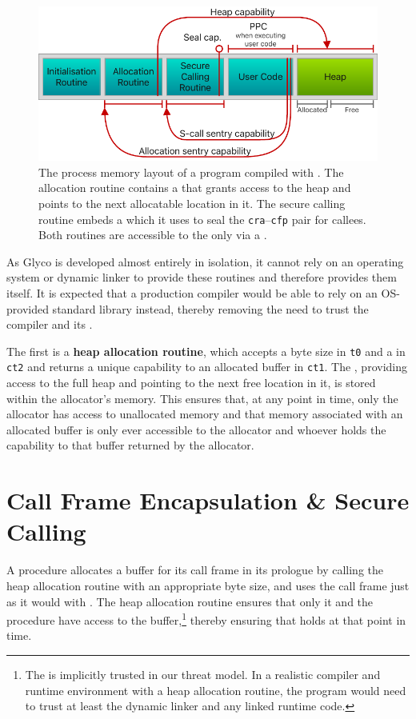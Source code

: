 \documentclass[main.tex]{subfiles}
\begin{document}
\begin{figure}
	\begin{center}
		\includegraphics{Images/GHSCC Process Memory.pdf}
	\end{center}
	\caption{The process memory layout of a program compiled with . The allocation routine contains a  that grants access to the heap and points to the next allocatable location in it. The secure calling routine embeds a  which it uses to seal the \texttt{cra}–\texttt{cfp} pair for callees. Both routines are accessible to the  only via a .}
	\label{fig:procmem}
\end{figure}

As Glyco is developed almost entirely in isolation, it cannot rely on an operating system or dynamic linker to provide these routines and therefore provides them itself. It is expected that a production compiler would be able to rely on an OS-provided standard library instead, thereby removing the need to trust the compiler and its .

The first  is a \textbf{heap allocation routine}, which accepts a byte size in \texttt{t0} and a  in \texttt{ct2} and returns a unique capability to an allocated buffer in \texttt{ct1}. The , providing access to the full heap and pointing to the next free location in it, is stored within the allocator's memory. This ensures that, at any point in time, only the allocator has access to unallocated memory and that memory associated with an allocated buffer is only ever accessible to the allocator and whoever holds the capability to that buffer returned by the allocator.

\section{Call Frame Encapsulation \& Secure Calling} \label{sct:ghscc}
A procedure allocates a buffer for its call frame in its prologue by calling the heap allocation routine with an appropriate byte size, and uses the call frame just as it would with . The heap allocation routine ensures that only it and the procedure have access to the buffer,\footnote{The  is implicitly trusted in our threat model. In a realistic compiler and runtime environment with a heap allocation routine, the program would need to trust at least the dynamic linker and any linked runtime code.} thereby ensuring that  holds at that point in time.
\end{document}

